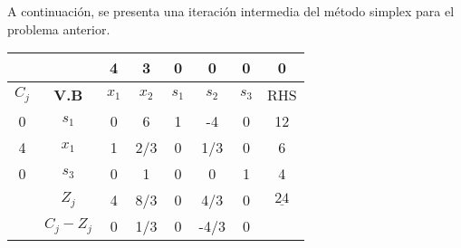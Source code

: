 \documentclass{templateNote}
\begin{document}
A continuaci\'on, se presenta una iteraci\'on intermedia del m\'etodo simplex para el problema anterior.
\begin{center}
    \begin{tabular}{|c|c|c|c|c|c|c|c|}
        \hline
        & & 4 & 3 & 0 & 0 & 0 & 0 \\ \hline
        $C_j$ & \textbf{V.B} & $x_1$ & $x_2$ & $s_1$ & $s_2$ & $s_3$ & RHS \\ \hline
        0 & $s_1$ & 0 & 6 & 1 & -4 & 0 & 12 \\
        4 & $x_1$ & 1 & 2/3 & 0 & 1/3 & 0 & 6 \\
        0 & $s_3$ & 0 & 1 & 0 & 0 & 1 & 4 \\ \hline
        & $Z_j$ & 4 & 8/3 & 0 & 4/3 & 0 & $\underline{24}$ \\ \hline
        & $C_j - Z_j$ & 0 & 1/3 & 0 & -4/3 & 0 & \\ \hline
    \end{tabular}
\end{center}
\end{document}
